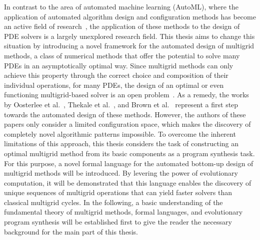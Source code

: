 In contrast to the area of automated machine learning (AutoML), where the application of automated algorithm design and configuration methods has become an active field of research~\cite{ren2021comprehensive,hutter2019automated,elsken2019neural,he2021automl,schrodi2022towards}, the application of these methods to the design of PDE solvers is a largely unexplored research field.
This thesis aims to change this situation by introducing a novel framework for the automated design of multigrid methods, a class of numerical methods that offer the potential to solve many PDEs in an asymptotically optimal way.
Since multigrid methods can only achieve this property through the correct choice and composition of their individual operations, for many PDEs, the design of an optimal or even functioning multigrid-based solver is an open problem~\cite{trottenberg2000multigrid,ernst2012difficult}.
As a remedy, the works by Oosterlee et al.~\cite{oosterlee2003genetic}, Thekale et al.~\cite{thekale2010optimizing}, and Brown et al.~\cite{brown2021tuning} represent a first step towards the automated design of these methods.
However, the authors of these papers only consider a limited configuration space, which makes the discovery of completely novel algorithmic patterns impossible.
To overcome the inherent limitations of this approach, this thesis considers the task of constructing an optimal multigrid method from its basic components as a program synthesis task.
For this purpose, a novel formal language for the automated bottom-up design of multigrid methods will be introduced.
By levering the power of evolutionary computation, it will be demonstrated that this language enables the discovery of unique sequences of multigrid operations that can yield faster solvers than classical multigrid cycles.
In the following, a basic understanding of the fundamental theory of multigrid methods, formal languages, and evolutionary program synthesis will be established first to give the reader the necessary background for the main part of this thesis.
